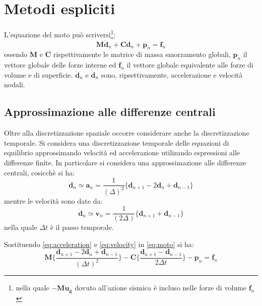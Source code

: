 \section{Metodi espliciti}
L'equazione del moto può scriversi\footnote{nella quale $-\boldsymbol{M \ddot{u}_g}$ dovuto all'azione sismica è incluso nelle forze di volume $\boldsymbol{f}_n$}:
\begin{equation}
	\boldsymbol {M\ddot d}_n + \boldsymbol C \boldsymbol{\dot d}_n + \boldsymbol{p}_n = \boldsymbol{f}_n
	\label{eq:moto}
\end{equation}
essendo $\boldsymbol{M}$ e $\boldsymbol{C}$ rispettivamente le matrice di massa smorzamento globali,  $\boldsymbol{p}_n$ il vettore globale delle forze interne ed $\boldsymbol{f}_n$ il vettore globale equivalente alle forze di volume e di superficie. $\boldsymbol{\ddot d}_n$ e $\boldsymbol{\dot d}_n$ sono, ripsettivamente, accelerazione e velocità nodali.

\subsection{Approssimazione alle differenze centrali}
Oltre alla discretizzazione spaziale occorre considerare anche la discretizzazione temporale. Si considera una discretizzazione temporale delle equazioni di equilibrio approssimando velocità ed accelerazione utilizando espressioni alle differenze finite. In particolare si considera una approssimazione alle differenze centrali, cosicchè si ha:
\begin{equation}
	\boldsymbol{\ddot{d}}_n \simeq \boldsymbol{a}_n = \frac{1}{(\varDelta)^2} \{\boldsymbol{d}_{n+1} -2 \boldsymbol{d}_n + \boldsymbol{d}_{n-1}\}
	\label{eq:acceleration}
\end{equation}
mentre le velocità sono date da:
\begin{equation}
	\boldsymbol{\dot{d}}_n \simeq \boldsymbol{v}_n = \frac{1}{(2\varDelta)} \{\boldsymbol{d}_{n+1} + \boldsymbol{d}_{n-1}\}
	\label{eq:velocity}
\end{equation}
nella quale $\Delta t$ è il passo temporale. 

Sostituendo \ref{eq:acceleration} e \ref{eq:velocity} in \ref{eq:moto} si ha:
\begin{equation}
	\boldsymbol{M} \{ \frac{\boldsymbol{d}_{n+1} -2 \boldsymbol{d}_n + \boldsymbol{d}_{n-1}} {(\Delta t)^2} \} -
	\boldsymbol{C} \{ \frac{\boldsymbol{d}_{n+1} - \boldsymbol{d}_{n-1}}{2 \varDelta t} \} - \boldsymbol{p}_n = \boldsymbol{f}_n
\end{equation}

